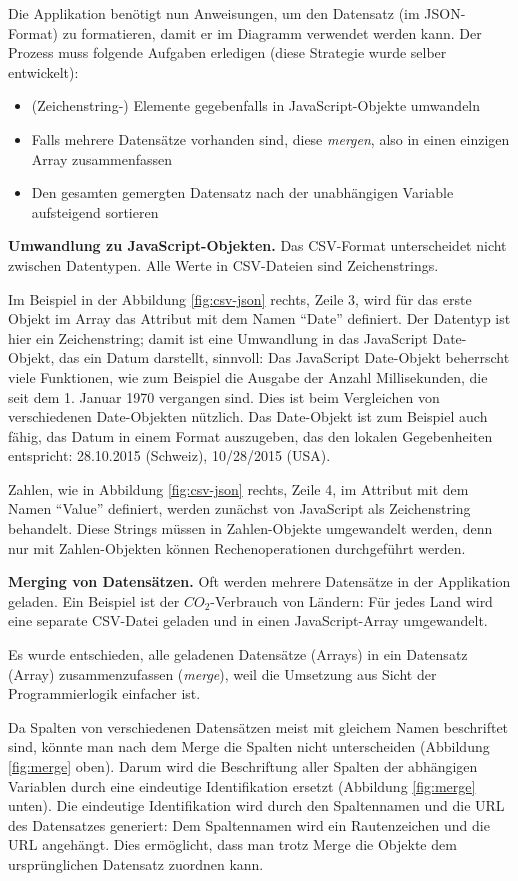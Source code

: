 Die Applikation benötigt nun Anweisungen, um den Datensatz (im JSON-Format) zu formatieren, damit er im Diagramm verwendet werden kann. Der Prozess muss folgende Aufgaben erledigen (diese Strategie wurde selber entwickelt):

\begin{itemize}
	\item (Zeichenstring-) Elemente gegebenfalls in JavaScript-Objekte umwandeln
	\item Falls mehrere Datensätze vorhanden sind, diese \textit{mergen}, also in einen einzigen Array zusammenfassen
	\item Den gesamten gemergten Datensatz nach der unabhängigen Variable aufsteigend sortieren
\end{itemize}

\textbf{Umwandlung zu JavaScript-Objekten.} Das CSV-Format unterscheidet nicht zwischen Datentypen. Alle Werte in CSV-Dateien sind Zeichenstrings.

Im Beispiel in der Abbildung \ref{fig:csv-json} rechts, Zeile 3, wird für das erste Objekt im Array das Attribut mit dem Namen "`Date"' definiert. Der Datentyp ist hier ein Zeichenstring; damit ist eine Umwandlung in das JavaScript Date-Objekt, das ein Datum darstellt, sinnvoll: Das JavaScript Date-Objekt beherrscht viele Funktionen, wie zum Beispiel die Ausgabe der Anzahl Millisekunden, die seit dem 1. Januar 1970 vergangen sind. Dies ist beim Vergleichen von verschiedenen Date-Objekten nützlich. Das Date-Objekt ist zum Beispiel auch fähig, das Datum in einem Format auszugeben, das den lokalen Gegebenheiten entspricht: 28.10.2015 (Schweiz), 10/28/2015 (USA).

Zahlen, wie in Abbildung \ref{fig:csv-json} rechts, Zeile 4, im Attribut mit dem Namen "`Value"' definiert, werden zunächst von JavaScript als Zeichenstring behandelt. Diese Strings müssen in Zahlen-Objekte umgewandelt werden, denn nur mit Zahlen-Objekten können Rechenoperationen durchgeführt werden.

\textbf{Merging von Datensätzen.} Oft werden mehrere Datensätze in der Applikation geladen. Ein Beispiel ist der $CO_2$-Verbrauch von Ländern: Für jedes Land wird eine separate CSV-Datei geladen und in einen JavaScript-Array umgewandelt.

Es wurde entschieden, alle geladenen Datensätze (Arrays) in ein Datensatz (Array) zusammenzufassen (\textit{merge}), weil die Umsetzung aus Sicht der Programmierlogik einfacher ist. 

Da Spalten von verschiedenen Datensätzen meist mit gleichem Namen beschriftet sind, könnte man nach dem Merge die Spalten nicht unterscheiden (Abbildung \ref{fig:merge} oben). Darum wird die Beschriftung aller Spalten der abhängigen Variablen durch eine eindeutige Identifikation ersetzt (Abbildung \ref{fig:merge} unten). Die eindeutige Identifikation wird durch den Spaltennamen und die URL des Datensatzes generiert: Dem Spaltennamen wird ein Rautenzeichen und die URL angehängt. Dies ermöglicht, dass man trotz Merge die Objekte dem ursprünglichen Datensatz zuordnen kann.


